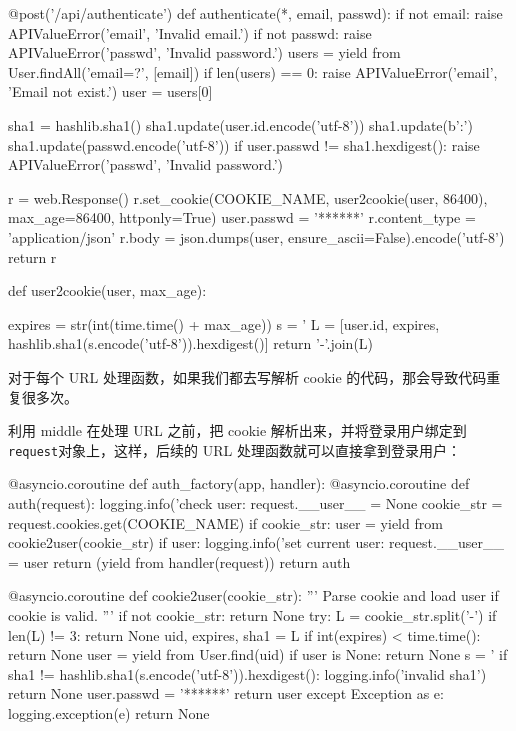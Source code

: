 \begin{pythoncode}
@post('/api/authenticate')
def authenticate(*, email, passwd):
    if not email:
        raise APIValueError('email', 'Invalid email.')
    if not passwd:
        raise APIValueError('passwd', 'Invalid password.')
    users = yield from User.findAll('email=?', [email])
    if len(users) == 0:
        raise APIValueError('email', 'Email not exist.')
    user = users[0]
    
    sha1 = hashlib.sha1()
    sha1.update(user.id.encode('utf-8'))
    sha1.update(b':')
    sha1.update(passwd.encode('utf-8'))
    if user.passwd != sha1.hexdigest():
        raise APIValueError('passwd', 'Invalid password.')
    
    r = web.Response()
    r.set_cookie(COOKIE_NAME, user2cookie(user, 86400), max_age=86400, httponly=True)
    user.passwd = '******'
    r.content_type = 'application/json'
    r.body = json.dumps(user, ensure_ascii=False).encode('utf-8')
    return r
    

def user2cookie(user, max_age):
    
    expires = str(int(time.time() + max_age))
    s = '%
    L = [user.id, expires, hashlib.sha1(s.encode('utf-8')).hexdigest()]
    return '-'.join(L)
\end{pythoncode}

对于每个 URL 处理函数，如果我们都去写解析 cookie
的代码，那会导致代码重复很多次。

利用 middle 在处理 URL 之前，把 cookie
解析出来，并将登录用户绑定到\texttt{request}对象上，这样，后续的 URL
处理函数就可以直接拿到登录用户：

\begin{pythoncode}
@asyncio.coroutine
def auth_factory(app, handler):
    @asyncio.coroutine
    def auth(request):
        logging.info('check user: %
        request.__user__ = None
        cookie_str = request.cookies.get(COOKIE_NAME)
        if cookie_str:
            user = yield from cookie2user(cookie_str)
            if user:
                logging.info('set current user: %
                request.__user__ = user
        return (yield from handler(request))
    return auth
    

@asyncio.coroutine
def cookie2user(cookie_str):
    '''
    Parse cookie and load user if cookie is valid.
    '''
    if not cookie_str:
        return None
    try:
        L = cookie_str.split('-')
        if len(L) != 3:
            return None
        uid, expires, sha1 = L
        if int(expires) < time.time():
            return None
        user = yield from User.find(uid)
        if user is None:
            return None
        s = '%
        if sha1 != hashlib.sha1(s.encode('utf-8')).hexdigest():
            logging.info('invalid sha1')
            return None
        user.passwd = '******'
        return user
    except Exception as e:
        logging.exception(e)
        return None
\end{pythoncode}

